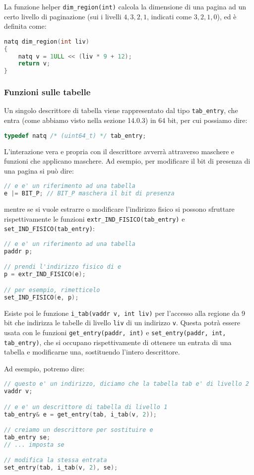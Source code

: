 \documentclass[a4paper,11pt]{article}
\begin{document}
La funzione helper \lstinline|dim_region(int)| calcola la dimensione di una pagina ad un certo livello di paginazione (sui i livelli $4, 3, 2, 1$, indicati come $3, 2, 1, 0$), ed è definita come:
\begin{lstlisting}[language=C++, style=codestyle]	
natq dim_region(int liv)
{
	natq v = 1ULL << (liv * 9 + 12);
	return v;
}
\end{lstlisting}

\subsubsection{Funzioni sulle tabelle}
Un singolo descrittore di tabella viene rappresentato dal tipo \lstinline|tab_entry|, che entra (come abbiamo visto nella sezione 14.0.3) in 64 bit, per cui possiamo dire:
\begin{lstlisting}[language=C++, style=codestyle]	
typedef natq /* (uint64_t) */ tab_entry;
\end{lstlisting}

L'interazione vera e propria con il descrittore avverrà attraverso maschere e funzioni che applicano maschere.
Ad esempio, per modificare il bit di presenza di una pagina si può dire:
\begin{lstlisting}[language=C++, style=codestyle]	
// e e' un riferimento ad una tabella
e |= BIT_P; // BIT_P maschera il bit di presenza
\end{lstlisting}
mentre se si vuole estrarre o modificare l'indirizzo fisico si possono sfruttare rispettivamente le funzioni \lstinline|extr_IND_FISICO(tab_entry)| e \lstinline|set_IND_FISICO(tab_entry)|:
\begin{lstlisting}[language=C++, style=codestyle]	
// e e' un riferimento ad una tabella
paddr p;

// prendi l'indirizzo fisico di e
p = extr_IND_FISICO(e);

// per esempio, rimetticelo
set_IND_FISICO(e, p);
\end{lstlisting}

Esiste poi le funzione \lstinline|i_tab(vaddr v, int liv)| per l'accesso alla regione da 9 bit che indirizza le tabelle di livello \lstinline|liv| di un indirizzo \lstinline|v|.
Questa potrà essere usata con le funzioni \lstinline|get_entry(paddr, int)| e \lstinline|set_entry(paddr, int, tab_entry)|, che si occupano rispettivamente di ottenere un entrata di una tabella e modificarne una, sostituendo l'intero descrittore.

Ad esempio, potremo dire:
\begin{lstlisting}[language=C++, style=codestyle]	
// questo e' un indirizzo, diciamo che la tabella tab e' di livello 2
vaddr v;

// e e' un descrittore di tabella di livello 1 
tab_entry& e = get_entry(tab, i_tab(v, 2));

// creiamo un descrittore per sostituire e
tab_entry se;
// ... imposta se

// modifica la stessa entrata
set_entry(tab, i_tab(v, 2), se);
\end{lstlisting}
\end{document}
